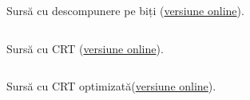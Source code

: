 \documentclass[../main.tex]{subfiles}
\begin{document}
Sursă cu descompunere pe biți (\href{https://codeforces.com/contest/1665/submission/235885905}{versiune online}).

\inputminted{cpp}{../src/math/gcd-guess-30.cpp}

Sursă cu CRT (\href{https://codeforces.com/contest/1665/submission/235974346}{versiune online}).

\inputminted{cpp}{../src/math/gcd-guess-23.cpp}

Sursă cu CRT optimizată(\href{https://codeforces.com/contest/1665/submission/237393303}{versiune online}).

\inputminted{cpp}{../src/math/gcd-guess-12.cpp}
\end{document}
